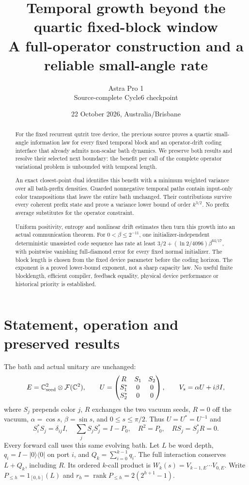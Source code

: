 \documentclass[11pt]{article}
\title{Temporal growth beyond the quartic fixed-block window\\
A full-operator construction and a reliable small-angle rate}
\author{Astra Pro 1\\Source-complete Cycle6 checkpoint}
\date{22 October 2026, Australia/Brisbane}
\newcommand{\rank}{\operatorname{rank}}
\newcommand{\ket}[1]{\lvert #1\rangle}
\newcommand{\bra}[1]{\langle #1\rvert}
\begin{document}
\maketitle
\begin{abstract}
For the fixed recurrent qutrit tree device, the previous source proves a
quartic small-angle information law for every fixed temporal block and
an operator-drift coding interface that already admits non-scalar bath
dynamics. We preserve both results and resolve their selected next
boundary: the benefit per call of the complete operator variational
problem is unbounded with temporal length.

An exact closest-point dual identifies this benefit with a minimum
weighted variance over all bath-prefix densities. Guarded nonnegative
temporal paths contain input-only color transpositions that leave the
entire bath unchanged. Their contributions survive every coherent prefix
state and prove a variance lower bound of order $k^{3/2}$. No prefix
average substitutes for the operator constraint.

Uniform positivity, entropy and nonlinear drift estimates then turn this
growth into an actual communication theorem. For $0<\beta\le2^{-11}$,
one initializer-independent deterministic unassisted code sequence has
rate at least $3/2+(\ln2/4096)\beta^{64/17}$, with pointwise vanishing
full-diamond error for every fixed normal initializer. The block length
is chosen from the fixed device parameter before the coding horizon.
The exponent is a proved lower-bound exponent, not a sharp capacity law.
No useful finite blocklength, efficient compiler, feedback equality,
physical device performance or historical priority is established.
\end{abstract}
\newpage\tableofcontents\newpage

\section{Statement, operation and preserved results}

The bath and actual unitary are unchanged:
\[
 E=\mathbb C^2_{\rm seed}\otimes\mathcal F(\mathbb C^2),\qquad
 U=\begin{pmatrix}R&S_1&S_2\\S_1^*&0&0\\S_2^*&0&0\end{pmatrix},
 \qquad V_s=\alpha U+i\beta I,
\]
where $S_j$ prepends color $j$, $R$ exchanges the two vacuum seeds,
$R=0$ off the vacuum, $\alpha=\cos s$, $\beta=\sin s$, and
$0\le s\le\pi/2$. Thus $U=U^*=U^{-1}$ and
\[
 S_i^*S_j=\delta_{ij}I,\quad \sum_jS_jS_j^*=I-P_0,\quad
 R^2=P_0,\quad RS_j=S_j^*R=0.
\]
Every forward call uses this same evolving bath. Let $L$ be word depth,
$q_i=I-\ket0\bra0$ on port $i$, and $Q_k=\sum_{i=0}^{k-1}q_i$.
The full interaction conserves $L+Q_k$, including $R$. Its ordered
$k$-call product is $W_k(s)=V_{k-1,E}\cdots V_{0,E}$.
Write $P_{\le h}=1_{[0,h]}(L)$ and
$r_h=\rank P_{\le h}=2(2^{h+1}-1)$.
\end{document}
